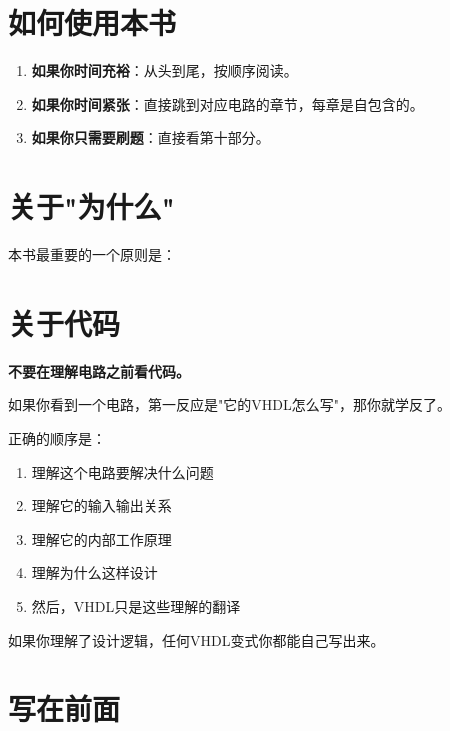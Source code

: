 \section*{如何使用本书}

\begin{enumerate}
  \item \textbf{如果你时间充裕}：从头到尾，按顺序阅读。
  \item \textbf{如果你时间紧张}：直接跳到对应电路的章节，每章是自包含的。
  \item \textbf{如果你只需要刷题}：直接看第十部分。
\end{enumerate}

\section*{关于"为什么"}

本书最重要的一个原则是：

\begin{center}
\end{center}

\section*{关于代码}

\textbf{不要在理解电路之前看代码。}

如果你看到一个电路，第一反应是"它的VHDL怎么写"，那你就学反了。

正确的顺序是：

\begin{enumerate}
  \item 理解这个电路要解决什么问题
  \item 理解它的输入输出关系
  \item 理解它的内部工作原理
  \item 理解为什么这样设计
  \item 然后，VHDL只是这些理解的翻译
\end{enumerate}

如果你理解了设计逻辑，任何VHDL变式你都能自己写出来。

\section*{写在前面}

